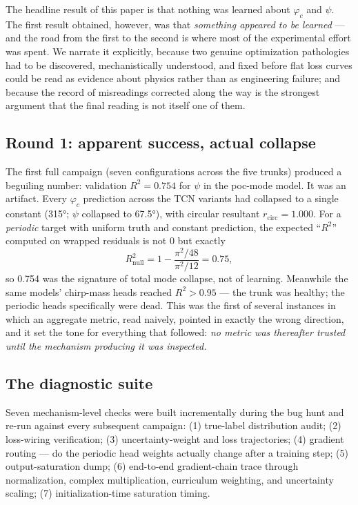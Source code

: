 The headline result of this paper is that nothing was learned about $\varphi_c$ and $\psi$.
The first result obtained, however, was that \emph{something appeared to be learned} --- and the road from the first to the second is where most of the experimental effort was spent.
We narrate it explicitly, because two genuine optimization pathologies had to be discovered, mechanistically understood, and fixed before flat loss curves could be read as evidence about physics rather than as engineering failure; and because the record of misreadings corrected along the way is the strongest argument that the final reading is not itself one of them.

\subsection{Round 1: apparent success, actual collapse}
\label{sec:phicpsi:round1}

The first full campaign (seven configurations across the five trunks) produced a beguiling number: validation $R^2 = 0.754$ for $\psi$ in the poc-mode model.
It was an artifact.
Every $\varphi_c$ prediction across the TCN variants had collapsed to a single constant (\ang{315}; $\psi$ collapsed to \ang{67.5}), with circular resultant $r_{\mathrm{circ}} = 1.000$.
For a \emph{periodic} target with uniform truth and constant prediction, the expected ``$R^2$'' computed on wrapped residuals is not 0 but exactly
\begin{equation}
    R^2_{\mathrm{null}} = 1 - \frac{\pi^2/48}{\pi^2/12} = 0.75,
\end{equation}
so 0.754 was the signature of total mode collapse, not of learning.
Meanwhile the same models' chirp-mass heads reached $R^2 > 0.95$ --- the trunk was healthy; the periodic heads specifically were dead.
This was the first of several instances in which an aggregate metric, read naively, pointed in exactly the wrong direction, and it set the tone for everything that followed: \emph{no metric was thereafter trusted until the mechanism producing it was inspected.}

\subsection{The diagnostic suite}
\label{sec:phicpsi:suite}

Seven mechanism-level checks were built incrementally during the bug hunt and re-run against every subsequent campaign: (1) true-label distribution audit; (2) loss-wiring verification; (3) uncertainty-weight and loss trajectories; (4) gradient routing --- do the periodic head weights actually change after a training step; (5) output-saturation dump; (6) end-to-end gradient-chain trace through normalization, complex multiplication, curriculum weighting, and uncertainty scaling; (7) initialization-time saturation timing.


